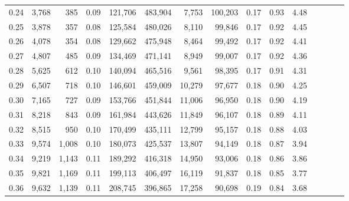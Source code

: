\begin{tabular}{rrrcrrrrrrrrrrr}
0.24 &   3,768 &    385 &                                       0.09 &  121,706 &  483,904 &    7,753 &  100,203 &  0.17 &  0.93 &                         4.48 \\
0.25 &   3,878 &    357 &                                       0.08 &  125,584 &  480,026 &    8,110 &   99,846 &  0.17 &  0.92 &                         4.45 \\
0.26 &   4,078 &    354 &                                       0.08 &  129,662 &  475,948 &    8,464 &   99,492 &  0.17 &  0.92 &                         4.41 \\
0.27 &   4,807 &    485 &                                       0.09 &  134,469 &  471,141 &    8,949 &   99,007 &  0.17 &  0.92 &                         4.36 \\
0.28 &   5,625 &    612 &                                       0.10 &  140,094 &  465,516 &    9,561 &   98,395 &  0.17 &  0.91 &                         4.31 \\
0.29 &   6,507 &    718 &                                       0.10 &  146,601 &  459,009 &   10,279 &   97,677 &  0.18 &  0.90 &                         4.25 \\
0.30 &   7,165 &    727 &                                       0.09 &  153,766 &  451,844 &   11,006 &   96,950 &  0.18 &  0.90 &                         4.19 \\
0.31 &   8,218 &    843 &                                       0.09 &  161,984 &  443,626 &   11,849 &   96,107 &  0.18 &  0.89 &                         4.11 \\
0.32 &   8,515 &    950 &                                       0.10 &  170,499 &  435,111 &   12,799 &   95,157 &  0.18 &  0.88 &                         4.03 \\
0.33 &   9,574 &  1,008 &                                       0.10 &  180,073 &  425,537 &   13,807 &   94,149 &  0.18 &  0.87 &                         3.94 \\
0.34 &   9,219 &  1,143 &                                       0.11 &  189,292 &  416,318 &   14,950 &   93,006 &  0.18 &  0.86 &                         3.86 \\
0.35 &   9,821 &  1,169 &                                       0.11 &  199,113 &  406,497 &   16,119 &   91,837 &  0.18 &  0.85 &                         3.77 \\
0.36 &   9,632 &  1,139 &                                       0.11 &  208,745 &  396,865 &   17,258 &   90,698 &  0.19 &  0.84 &                         3.68 \\

\end{tabular}
